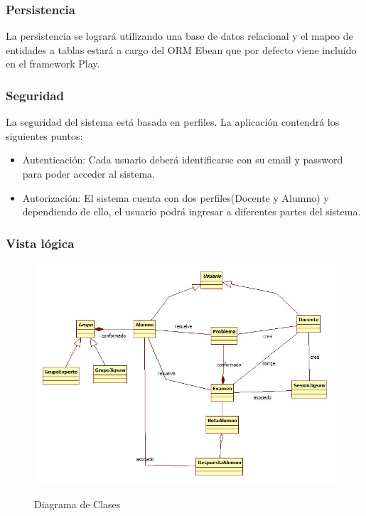 \subsubsection{Persistencia}
La persistencia se logrará utilizando una base de datos relacional y el mapeo de entidades a tablas estará a cargo del ORM Ebean que por defecto viene incluído en el framework Play.

\subsubsection{Seguridad}
La seguridad del sistema está basada en perfiles. La aplicación contendrá los siguientes puntos:

\begin{itemize}
	\item Autenticación: Cada usuario deberá identificarse con su email y password para poder acceder al sistema.
	\item Autorización: El sistema cuenta con dos perfiles(Docente y Alumno) y dependiendo de ello, el usuario podrá ingresar a diferentes partes del sistema.
	\end{itemize}

\subsubsection{Vista lógica}
\begin{figure}[!h]
\centering
\includegraphics[scale=0.5]{figuras/sad/diagrama_de_clases.jpg}\\
\caption{Diagrama de Clases}\label{fig:c4_diagrama_de_clases}
\end{figure}

